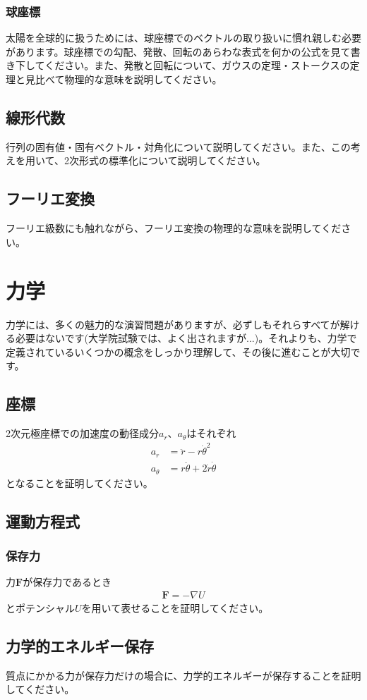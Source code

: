 \documentclass{ltjarticle}
\begin{document}
\subsubsection{球座標}
太陽を全球的に扱うためには、球座標でのベクトルの取り扱いに慣れ親しむ必要があります。球座標での勾配、発散、回転のあらわな表式を何かの公式を見て書き下してください。また、発散と回転について、ガウスの定理・ストークスの定理と見比べて物理的な意味を説明してください。
\subsection{線形代数}
行列の固有値・固有ベクトル・対角化について説明してください。また、この考えを用いて、2次形式の標準化について説明してください。
\subsection{フーリエ変換}
フーリエ級数にも触れながら、フーリエ変換の物理的な意味を説明してください。
\section{力学}
力学には、多くの魅力的な演習問題がありますが、必ずしもそれらすべてが解ける必要はないです(大学院試験では、よく出されますが...)。それよりも、力学で定義されているいくつかの概念をしっかり理解して、その後に進むことが大切です。
\subsection{座標}
2次元極座標での加速度の動径成分$a_r$、$a_\theta$はそれぞれ
\begin{align}
    a_r &= \ddot{r} - r\dot{\theta}^2 \\
    a_\theta &= r\ddot{\theta} + 2\dot{r}\dot{\theta}
\end{align}
となることを証明してください。
\subsection{運動方程式}
\subsubsection{保存力}
力$\bm{F}$が保存力であるとき
\begin{align}
    \bm{F} = - \nabla U
\end{align}
とポテンシャル$U$を用いて表せることを証明してください。
\subsection{力学的エネルギー保存}
質点にかかる力が保存力だけの場合に、力学的エネルギーが保存することを証明してください。
\end{document}
